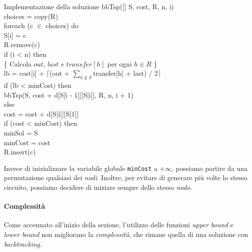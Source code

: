 \begin{minicode}{Implementazione della soluzione}
\ind bbTsp([] S,  cost,  R,  n,  i)\\
     choices = copy(R)\\
    \indf foreach (c $\in$ choices) do\\
        S[i] = c\\
        R.remove(c)\\
        \indff if (i < n) then\\
            \{ Calcola $out$, $last$ e $transfer[h]$ per ogni $h\in R$ \}\\
             lb = cost[i] + $\lceil$(out + $\sum_{h\notin S}$transfer[h] + last) / 2$\rceil$\\
            \indfff if (lb < minCost) then\\
                bbTsp(S, cost + d[S[i - 1]][S[i]], R, n, i + 1)\\
        \indff else\\
            cost = cost + d[S[i]][S[1]]\\
            \indfff if (cost < minCost) then\\
                minSol = S\\
                minCost = cost\\
        \indff R.insert(c)
\end{minicode}

\noindent
Invece di inizializzare la variabile globale \texttt{minCost} a $+\infty$,
possiamo partire da una permutazione qualsiasi dei \emph{nodi}. Inoltre, per
evitare di generare più volte lo stesso circuito, possiamo decidere di iniziare
sempre dello stesso \emph{nodo}.

\paragraph{Complessità}
Come accennato all'inizio della sezione, l'utilizzo delle funzioni \emph{upper
bound} e \emph{lower bound} non migliorano la \emph{complessità}, che rimane
quella di una soluzione con \emph{backtracking}.

